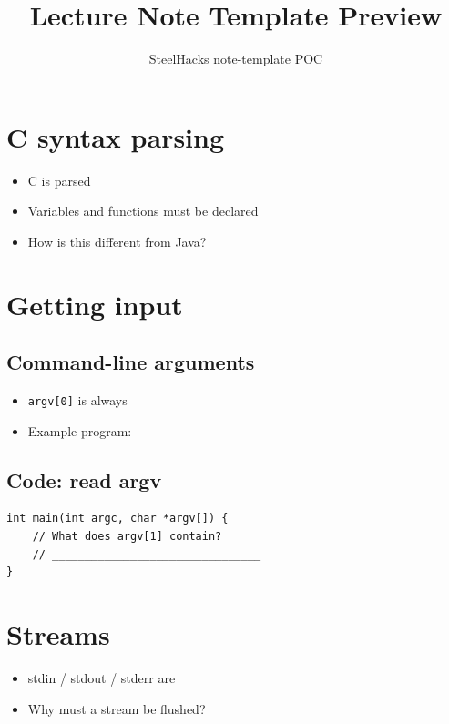 \documentclass[14pt]{extarticle}
\title{Lecture Note Template Preview}
\author{SteelHacks note-template POC}
\date{}
\begin{document}
\maketitle

\section{C syntax parsing}

\begin{itemize}[leftmargin=*]
  \item C is parsed \hrulefill
  \item Variables and functions must be declared \hrulefill
  \item How is this different from Java? \hrulefill
\end{itemize}

\vspace{1.2em}

\section{Getting input}

\subsection{Command-line arguments}
\begin{itemize}[leftmargin=*]
  \item \texttt{argv[0]} is always \hrulefill
  \item Example program: \hrulefill
\end{itemize}

\subsection{Code: read argv}
\begin{lstlisting}
int main(int argc, char *argv[]) {
    // What does argv[1] contain?
    // ________________________________
}
\end{lstlisting}

\vspace{1.2em}

\section{Streams}

\begin{itemize}[leftmargin=*]
  \item stdin / stdout / stderr are \hrulefill
  \item Why must a stream be flushed? \hrulefill
\end{itemize}
\end{document}
